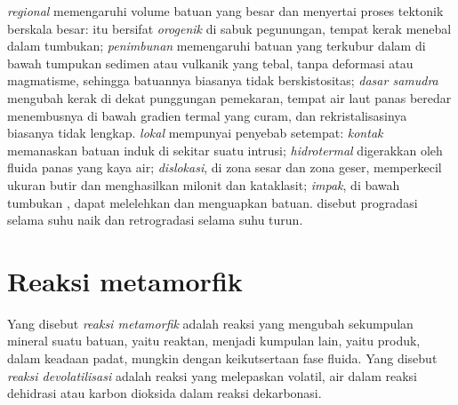  \emph{regional} memengaruhi volume batuan yang besar dan menyertai proses
tektonik berskala besar:  itu bersifat \emph{orogenik} di sabuk pegunungan, tempat kerak menebal dalam
tumbukan;  \emph{penimbunan} memengaruhi batuan yang terkubur dalam di bawah tumpukan
sedimen atau vulkanik yang tebal, tanpa deformasi atau magmatisme, sehingga batuannya
biasanya tidak berskistositas;  \emph{dasar samudra} mengubah kerak di dekat
punggungan pemekaran, tempat air laut panas beredar menembusnya di bawah gradien termal
yang curam, dan rekristalisasinya biasanya tidak lengkap.  \emph{lokal}
mempunyai penyebab setempat:  \emph{kontak} memanaskan batuan induk di sekitar suatu intrusi;
 \emph{hidrotermal} digerakkan oleh fluida panas yang kaya air;
 \emph{dislokasi}, di zona sesar dan zona geser, memperkecil ukuran butir dan
menghasilkan milonit dan kataklasit;  \emph{impak}, di bawah tumbukan ,
dapat melelehkan dan menguapkan batuan.  disebut progradasi selama suhu naik dan
retrogradasi selama suhu turun.

\section{Reaksi metamorfik}\label{sec:b2:metamorphic-facies:reactions}

\begin{definition}\label{def:b2:metamorphic-facies:reaction}
Yang disebut \emph{reaksi metamorfik} adalah reaksi yang mengubah sekumpulan mineral
suatu batuan, yaitu reaktan, menjadi kumpulan lain, yaitu produk, dalam keadaan padat, mungkin
dengan keikutsertaan fase fluida. Yang disebut \emph{reaksi devolatilisasi}
adalah reaksi yang melepaskan volatil, air dalam reaksi dehidrasi atau karbon
dioksida dalam reaksi dekarbonasi.
\end{definition}


